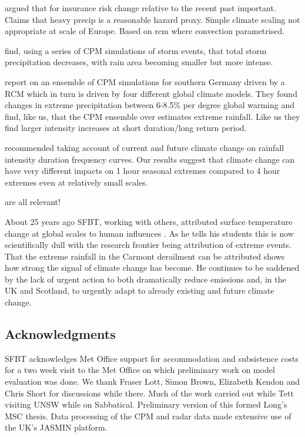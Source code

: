 \documentclass[11pt,a4paper]{article}
\begin{document}
\cite{lang2024catmodels} argued that for insurance risk change relative to the recent past important. Claims that heavy precip is a reasonable hazard proxy. Simple climate scaling not appropriate at scale of Europe. Based on  rcm where convection parametrised.

\cite{Moshe2022extremes} find, using a series of CPM simulations  of storm events, that total storm precipitation decreases, with rain area becoming smaller but more intense. 

\cite{hundhausen2024extreme_precip} report on an ensemble of CPM simulations for southern Germany driven by a RCM which in turn is driven by four different global climate models. They found changes in extreme precipitation between 6-8.5\% per degree global warming and find, like us, that the CPM ensemble over estimates extreme rainfall. Like us they find larger intensity increases at short duration/long return period.  

\cite{martel2021rainfall_ifd} recommended taking account of current and future climate change on rainfall intensity duration frequency curves. Our results suggest that climate change can have very different impacts on 1 hour seasonal extremes compared to 4 hour extremes even at relatively small scales. 

\cite{saltikoff2019radar_climate,kendon2021ukclimate,karoly06cet,harrison2000nimrod,kendon2023uk_climate} are all relevant! 

About 25 years ago SFBT, working with others, attributed surface temperature  change at global scales to human influences \parencite{tett99c20tc,stott00sci}. As he tells his students this is now scientifically dull with the research frontier being attribution of extreme  events. That the extreme rainfall in the Carmont derailment can be attributed shows how strong the signal of climate change has become.  He continues to be saddened by the lack of urgent action to both dramatically reduce emissions and, in the UK and Scotland, to urgently adapt to already existing and future climate change\parencite{ccc2024no_action}.

\printbibliography %

\subsection*{Acknowledgments}
SFBT acknowledges  Met Office support for accommodation and subsistence costs for a two week visit to the Met Office on which preliminary work on model evaluation was done. We thank Fraser Lott, Simon Brown, Elizabeth Kendon and Chris Short for discussions while there. Much of the  work carried out while Tett visiting UNSW while on Sabbatical. Preliminary version of this formed Long's MSC thesis.  Data processing of the CPM and radar data made extensive use of the UK's JASMIN platform. 
\end{document}

